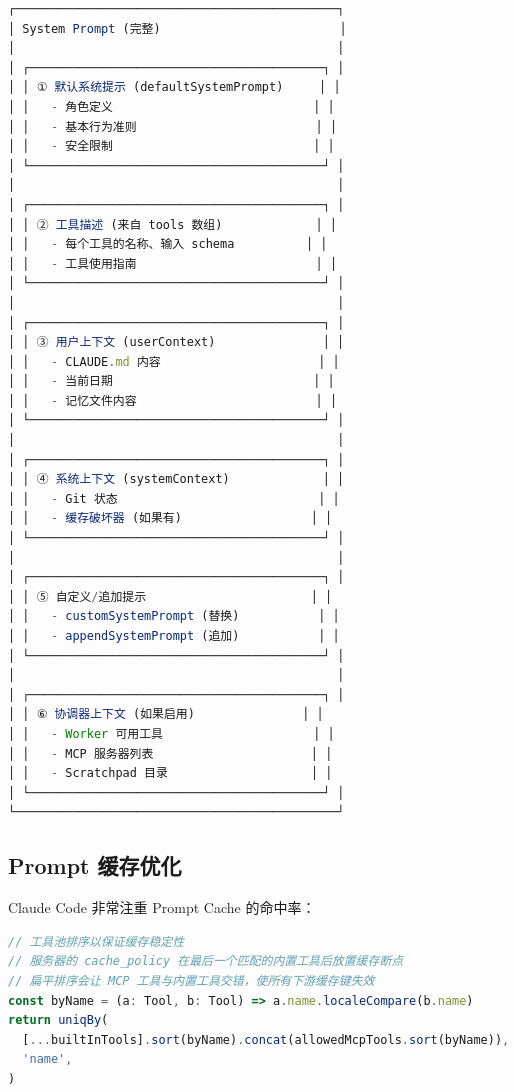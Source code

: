 \begin{lstlisting}[language=TypeScript,breaklines=true]
┌─────────────────────────────────────────────┐
│ System Prompt (完整)                         │
│                                             │
│ ┌─────────────────────────────────────────┐ │
│ │ ① 默认系统提示 (defaultSystemPrompt)     │ │
│ │   - 角色定义                            │ │
│ │   - 基本行为准则                         │ │
│ │   - 安全限制                            │ │
│ └─────────────────────────────────────────┘ │
│                                             │
│ ┌─────────────────────────────────────────┐ │
│ │ ② 工具描述 (来自 tools 数组)             │ │
│ │   - 每个工具的名称、输入 schema          │ │
│ │   - 工具使用指南                         │ │
│ └─────────────────────────────────────────┘ │
│                                             │
│ ┌─────────────────────────────────────────┐ │
│ │ ③ 用户上下文 (userContext)               │ │
│ │   - CLAUDE.md 内容                      │ │
│ │   - 当前日期                            │ │
│ │   - 记忆文件内容                         │ │
│ └─────────────────────────────────────────┘ │
│                                             │
│ ┌─────────────────────────────────────────┐ │
│ │ ④ 系统上下文 (systemContext)             │ │
│ │   - Git 状态                            │ │
│ │   - 缓存破坏器 (如果有)                  │ │
│ └─────────────────────────────────────────┘ │
│                                             │
│ ┌─────────────────────────────────────────┐ │
│ │ ⑤ 自定义/追加提示                       │ │
│ │   - customSystemPrompt (替换)           │ │
│ │   - appendSystemPrompt (追加)           │ │
│ └─────────────────────────────────────────┘ │
│                                             │
│ ┌─────────────────────────────────────────┐ │
│ │ ⑥ 协调器上下文 (如果启用)               │ │
│ │   - Worker 可用工具                     │ │
│ │   - MCP 服务器列表                      │ │
│ │   - Scratchpad 目录                    │ │
│ └─────────────────────────────────────────┘ │
└─────────────────────────────────────────────┘
\end{lstlisting}

\subsection{Prompt 缓存优化}

Claude Code 非常注重 Prompt Cache 的命中率：

\begin{lstlisting}[language=TypeScript,breaklines=true]
// 工具池排序以保证缓存稳定性
// 服务器的 cache_policy 在最后一个匹配的内置工具后放置缓存断点
// 扁平排序会让 MCP 工具与内置工具交错，使所有下游缓存键失效
const byName = (a: Tool, b: Tool) => a.name.localeCompare(b.name)
return uniqBy(
  [...builtInTools].sort(byName).concat(allowedMcpTools.sort(byName)),
  'name',
)
\end{lstlisting}

